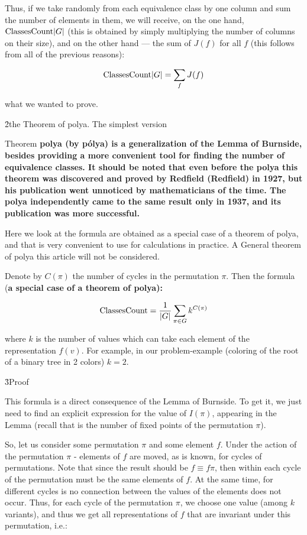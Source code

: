 Thus, if we take randomly from each equivalence class by one column and sum the number of elements in them, we will receive, on the one hand, ${\rm ClassesCount} |G|$ (this is obtained by simply multiplying the number of columns on their size), and on the other hand --- the sum of $J(f)$ for all $f$ (this follows from all of the previous reasons):

$$ {\rm ClassesCount} |G| = \sum_{f} J(f) $$

what we wanted to prove.

\h2{the Theorem of polya. The simplest version}

Theorem \bf{polya} (by pólya) is a generalization of the Lemma of Burnside, besides providing a more convenient tool for finding the number of equivalence classes. It should be noted that even before the polya this theorem was discovered and proved by Redfield (Redfield) in 1927, but his publication went unnoticed by mathematicians of the time. The polya independently came to the same result only in 1937, and its publication was more successful.

Here we look at the formula are obtained as a special case of a theorem of polya, and that is very convenient to use for calculations in practice. A General theorem of polya this article will not be considered.

Denote by $C(\pi)$ the number of cycles in the permutation $\pi$. Then the formula (\bf{a special case of a theorem of polya}):

$$ {\rm ClassesCount} = \frac{1}{|G|} \sum_{\pi \in G} k^{ C(\pi) } $$

where $k$ is the number of values which can take each element of the representation $f(v)$. For example, in our problem-example (coloring of the root of a binary tree in 2 colors) $k = 2$.

\h3{Proof}

This formula is a direct consequence of the Lemma of Burnside. To get it, we just need to find an explicit expression for the value of $I(\pi)$, appearing in the Lemma (recall that is the number of fixed points of the permutation $\pi$).

So, let us consider some permutation $\pi$ and some element $f$. Under the action of the permutation $\pi$ - elements of $f$ are moved, as is known, for cycles of permutations. Note that since the result should be $f \equiv f \pi$, then within each cycle of the permutation must be the same elements of $f$. At the same time, for different cycles is no connection between the values of the elements does not occur. Thus, for each cycle of the permutation $\pi$, we choose one value (among $k$ variants), and thus we get all representations of $f$ that are invariant under this permutation, i.e.:

